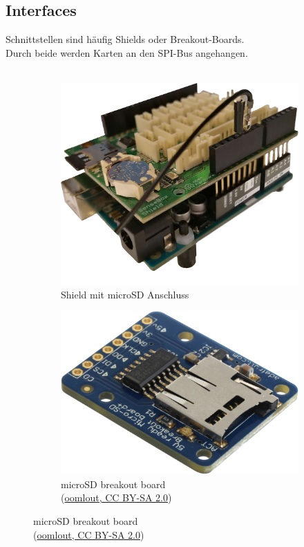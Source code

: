 \documentclass[ngerman]{schoolPres}
\begin{document}
  \subsection{Interfaces}%
  \begin{frame}
    Schnittstellen sind häufig Shields oder Breakout-Boards.\\
    Durch beide werden Karten an den SPI-Bus angehangen.\\~\\

    \begin{figure}[!ht]
      \centering
      \begin{subfigure}{.3\linewidth}
        \includegraphics[width=\linewidth]{media/shield.jpg}
        \caption{\tiny Shield mit microSD Anschluss}
      \end{subfigure}\hspace{4em}
      \begin{subfigure}{.3\linewidth}
        \includegraphics[width=\linewidth]{media/sd-breakout.jpg}
        \caption{\tiny microSD breakout board\\(\href{https://www.flickr.com/photos/snazzyguy/6234676208/}{oomlout, CC BY-SA 2.0})}
      \end{subfigure}
    \end{figure}


\end{frame}
\end{document}
